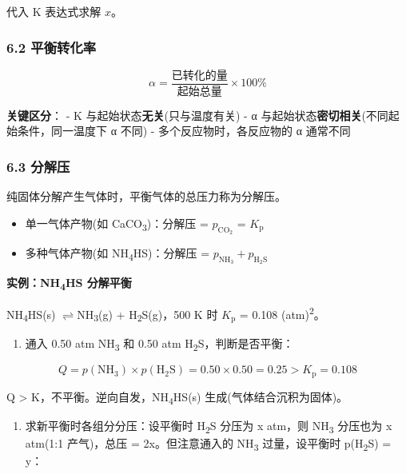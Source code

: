 \documentclass[a4paper,11pt]{ctexart}
\providecommand{\tightlist}{\setlength{\itemsep}{0pt}\setlength{\parskip}{0pt}}
\newcommand{\箭}{\ensuremath{\rightarrow}}
\newcommand{\左箭}{\ensuremath{\leftarrow}}
\newcommand{\上箭}{\ensuremath{\uparrow}}
\newcommand{\下箭}{\ensuremath{\downarrow}}
\newcommand{\衡}{\ensuremath{\rightleftharpoons}}
\newcommand{\双箭}{\ensuremath{\leftrightarrow}}
\newcommand{\约等于}{\ensuremath{\approx}}
\newcommand{\小于等于}{\ensuremath{\leq}}
\newcommand{\大于等于}{\ensuremath{\geq}}
\newcommand{\不等于}{\ensuremath{\neq}}
\newcommand{\西格马}{\ensuremath{\sigma}}
\newcommand{\派}{\ensuremath{\pi}}
\begin{document}
代入 K 表达式求解 \(x\)。

\subsubsection{6.2 平衡转化率}\label{ux5e73ux8861ux8f6cux5316ux7387}

\[
\alpha = \frac{\text{已转化的量}}{\text{起始总量}} \times 100\%
\]

\textbf{关键区分}：
- K 与起始状态\textbf{无关}(只与温度有关)
- α 与起始状态\textbf{密切相关}(不同起始条件，同一温度下 α 不同)
- 多个反应物时，各反应物的 α 通常不同

\subsubsection{6.3 分解压}\label{ux5206ux89e3ux538b}

纯固体分解产生气体时，平衡气体的总压力称为分解压。

\begin{itemize}
\tightlist
\item
  单一气体产物(如 CaCO\textsubscript{3})：分解压 = \(p_{\mathrm{CO_2}}\) = \(K_{\mathrm p}\)
\item
  多种气体产物(如 NH\textsubscript{4}HS)：分解压 = \(p_{\mathrm{NH_3}} + p_{\mathrm{H_2S}}\)
\end{itemize}

\textbf{实例：NH\textsubscript{4}HS 分解平衡}

NH\textsubscript{4}HS(s) \衡 NH\textsubscript{3}(g) + H\textsubscript{2}S(g)，500 K 时 \(K_{\mathrm p}\) = 0.108 (atm)\textsuperscript{2}。

\begin{enumerate}
\def\labelenumi{(\alph{enumi})}
\tightlist
\item
  通入 0.50 atm NH\textsubscript{3} 和 0.50 atm H\textsubscript{2}S，判断是否平衡：
\end{enumerate}

\[
Q = p(\mathrm{NH_3}) \times p(\mathrm{H_2S}) = 0.50 \times 0.50 = 0.25 > K_{\mathrm p} = 0.108
\]

Q \textgreater{} K，不平衡。逆向自发，NH\textsubscript{4}HS(s) 生成(气体结合沉积为固体)。

\begin{enumerate}
\def\labelenumi{(\alph{enumi})}
\setcounter{enumi}{1}
\tightlist
\item
  求新平衡时各组分分压：设平衡时 H\textsubscript{2}S 分压为 x atm，则 NH\textsubscript{3} 分压也为 x atm(1:1 产气)，总压 = 2x。但注意通入的 NH\textsubscript{3} 过量，设平衡时 p(H\textsubscript{2}S) = y：
\end{enumerate}
\end{document}
